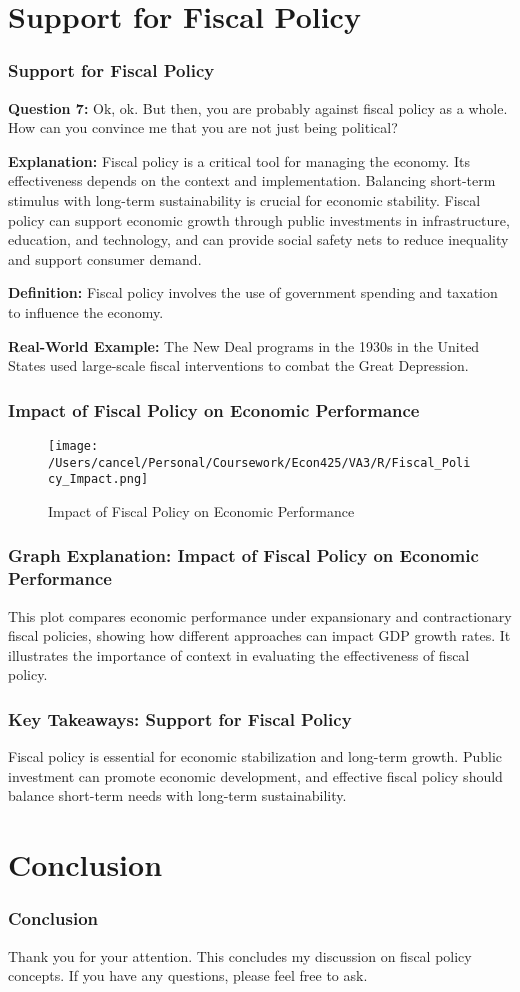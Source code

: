 \documentclass{beamer}
\begin{document}
\section{Support for Fiscal Policy}
\begin{frame}
    \frametitle{Support for Fiscal Policy}
    \textbf{Question 7:} Ok, ok. But then, you are probably against fiscal policy as a whole. How can you convince me that you are not just being political?

    \textbf{Explanation:} Fiscal policy is a critical tool for managing the economy. Its effectiveness depends on the context and implementation. Balancing short-term stimulus with long-term sustainability is crucial for economic stability. Fiscal policy can support economic growth through public investments in infrastructure, education, and technology, and can provide social safety nets to reduce inequality and support consumer demand.

    \textbf{Definition:} Fiscal policy involves the use of government spending and taxation to influence the economy.

    \textbf{Real-World Example:} The New Deal programs in the 1930s in the United States used large-scale fiscal interventions to combat the Great Depression.
\end{frame}

\begin{frame}
    \frametitle{Impact of Fiscal Policy on Economic Performance}
    \begin{figure}[h!]
        \centering
        \texttt{[image: /Users/cancel/Personal/Coursework/Econ425/VA3/R/Fiscal\_Policy\_Impact.png]}
        \caption{Impact of Fiscal Policy on Economic Performance}
    \end{figure}
\end{frame}

\begin{frame}
    \frametitle{Graph Explanation: Impact of Fiscal Policy on Economic Performance}
    This plot compares economic performance under expansionary and contractionary fiscal policies, showing how different approaches can impact GDP growth rates. It illustrates the importance of context in evaluating the effectiveness of fiscal policy.
\end{frame}

\begin{frame}
    \frametitle{Key Takeaways: Support for Fiscal Policy}
    Fiscal policy is essential for economic stabilization and long-term growth. Public investment can promote economic development, and effective fiscal policy should balance short-term needs with long-term sustainability.
\end{frame}

\section{Conclusion}
\begin{frame}
    \frametitle{Conclusion}
    Thank you for your attention. This concludes my discussion on fiscal policy concepts. If you have any questions, please feel free to ask.
\end{frame}
\end{document}
